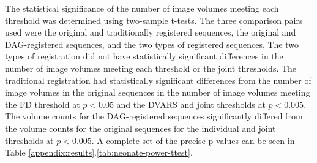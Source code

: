 The statistical significance of the number of image volumes meeting each threshold was determined using two-sample t-tests. The three comparison pairs used were the original and traditionally registered sequences, the original and DAG-registered sequences, and the two types of registered sequences. The two types of registration did not have statistically significant differences in the number of image volumes meeting each threshold or the joint thresholds. The traditional registration had statistically significant differences from the number of image volumes in the original sequences in the number of image volumes meeting the FD threshold at $p < 0.05$ and the DVARS and joint thresholds at $p < 0.005$. The volume counts for the DAG-registered sequences significantly differed from the volume counts for the original sequences for the individual and joint thresholds at $p < 0.005$. A complete set of the precise p-values can be seen in Table \ref{appendix:results}.\ref{tab:neonate-power-ttest}.

